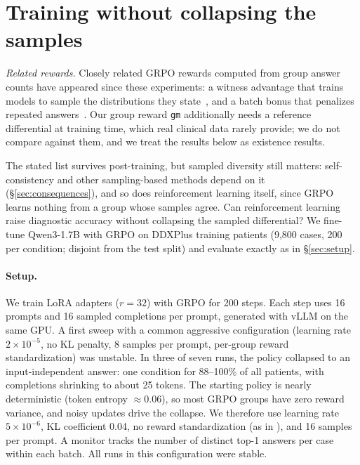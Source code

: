 \documentclass[11pt]{article}
\begin{document}
\section{Training without collapsing the samples}\label{sec:training}
\emph{Related rewards.} Closely related GRPO rewards computed from group answer counts have appeared since these experiments: a witness advantage that trains models to sample the distributions they state~\citep{arabi2026samplewhat}, and a batch bonus that penalizes repeated answers~\citep{song2025outcome}. Our group reward \texttt{gm} additionally needs a reference differential at training time, which real clinical data rarely provide; we do not compare against them, and we treat the results below as existence results.

The stated list survives post-training, but sampled diversity still matters: self-consistency and other sampling-based methods depend on it (\S\ref{sec:consequences}), and so does reinforcement learning itself, since GRPO learns nothing from a group whose samples agree.
Can reinforcement learning raise diagnostic accuracy without collapsing the sampled differential? We fine-tune Qwen3-1.7B with GRPO on DDXPlus training patients (9,800 cases, 200 per condition; disjoint from the test split) and evaluate exactly as in \S\ref{sec:setup}.

\paragraph{Setup.}
We train LoRA adapters ($r{=}32$) with GRPO for 200 steps. Each step uses 16 prompts and 16 sampled completions per prompt, generated with vLLM on the same GPU.
A first sweep with a common aggressive configuration (learning rate $2{\times}10^{-5}$, no KL penalty, 8 samples per prompt, per-group reward standardization) was unstable. In three of seven runs, the policy collapsed to an input-independent answer: one condition for 88--100\% of all patients, with completions shrinking to about 25 tokens.
The starting policy is nearly deterministic (token entropy ${\approx}0.06$), so most GRPO groups have zero reward variance, and noisy updates drive the collapse.
We therefore use learning rate $5{\times}10^{-6}$, KL coefficient 0.04, no reward standardization (as in \citet{puri2026beyondmode}), and 16 samples per prompt. A monitor tracks the number of distinct top-1 answers per case within each batch. All runs in this configuration were stable.
\end{document}
